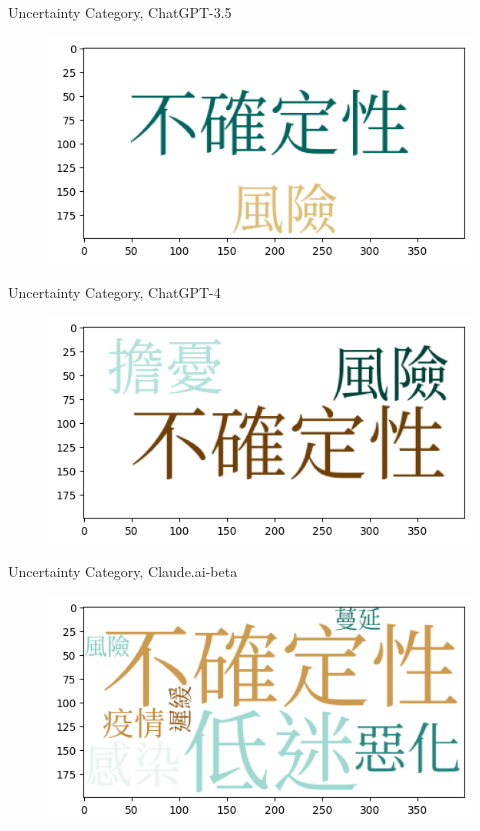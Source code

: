 \documentclass[12pt]{beamer}
\begin{document}
\begin{frame}{Uncertainty Category, ChatGPT-3.5}
\begin{figure}[H]
\centering
\includegraphics[width=11.5cm]{Figures/fig7.png}
\end{figure}
\end{frame}


\begin{frame}{Uncertainty Category, ChatGPT-4}
\begin{figure}[H]
\centering
\includegraphics[width=11.5cm]{Figures/fig8.png}
\end{figure}
\end{frame}


\begin{frame}{Uncertainty Category, Claude.ai-beta}
\begin{figure}[H]
\centering
\includegraphics[width=11.5cm]{Figures/fig9.png}
\end{figure}
\end{frame}
\end{document}
